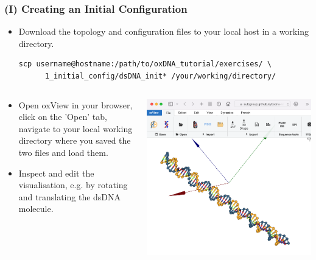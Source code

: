 \documentclass[slidestop,compress,9pt]{beamer}
\begin{document}
\begin{frame}[fragile]
\frametitle{(I) Creating an Initial Configuration}

\begin{itemize}
\item Download the topology and configuration files to your local host in a working directory.
\begin{lstlisting}
scp username@hostname:/path/to/oxDNA_tutorial/exercises/ \
      1_initial_config/dsDNA_init* /your/working/directory/
\end{lstlisting}
\end{itemize}

\begin{columns}

\begin{column}{0.48\textwidth}

\begin{itemize}
\setlength\itemsep{15pt}
\item Open oxView in your browser,\\
click on the 'Open' tab,\\
navigate to your local working directory where you saved the two files and load them.

\item Inspect and edit the visualisation, e.g. by rotating and translating the dsDNA molecule.
\end{itemize}
\end{column}

\begin{column}{0.48\textwidth}

\includegraphics[width=\textwidth]{oxView_dsDNA_init.png}

\end{column}
\end{columns}

\end{frame}
\end{document}
